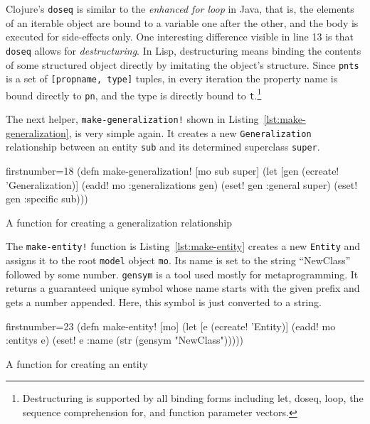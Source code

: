 \documentclass[11pt]{article}
\begin{document}
Clojure's \verb|doseq| is similar to the \emph{enhanced for loop} in Java, that
is, the elements of an iterable object are bound to a variable one after the
other, and the body is executed for side-effects only.  One interesting
difference visible in line 13 is that \verb|doseq| allows for
\emph{destructuring}.  In Lisp, destructuring means binding the contents of
some structured object directly by imitating the object's structure.  Since
\verb|pnts| is a set of \verb|[propname, type]| tuples, in every iteration the
property name is bound directly to \verb|pn|, and the type is directly bound to
\verb|t|.\footnote{Destructuring is supported by all binding forms including
  \textsf{let}, \textsf{doseq}, \textsf{loop}, the sequence comprehension
  \textsf{for}, and function parameter vectors.}

The next helper, \verb|make-generalization!| shown in
Listing~\ref{lst:make-generalization}, is very simple again.  It creates a new
\verb|Generalization| relationship between an entity \verb|sub| and its
determined superclass \verb|super|.

\begin{listing}[htbp]
  \begin{clojurecode*}{firstnumber=18}
(defn make-generalization! [mo sub super]
  (let [gen (ecreate! 'Generalization)]
    (eadd! mo :generalizations gen)
    (eset! gen :general super)
    (eset! gen :specific sub)))
  \end{clojurecode*}
  \caption{A function for creating a generalization relationship}
  \label{lst:make-generalization}
\end{listing}

The \verb|make-entity!| function is Listing~\ref{lst:make-entity} creates a new
\verb|Entity| and assigns it to the root \verb|model| object \verb|mo|.  Its
name is set to the string ``NewClass'' followed by some number.  \verb|gensym|
is a tool used mostly for metaprogramming.  It returns a guaranteed unique
symbol whose name starts with the given prefix and gets a number appended.
Here, this symbol is just converted to a string.

\begin{listing}[htbp]
  \begin{clojurecode*}{firstnumber=23}
(defn make-entity! [mo]
  (let [e (ecreate! 'Entity)]
    (eadd! mo :entitys e)
    (eset! e :name (str (gensym "NewClass")))))
  \end{clojurecode*}
  \caption{A function for creating an entity}
  \label{lst:make-entity}
\end{listing}
\end{document}
